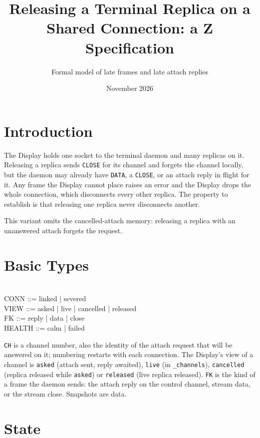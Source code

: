 \documentclass[a4paper,10pt,fleqn]{article}
\begin{document}
\title{Releasing a Terminal Replica on a Shared Connection: a Z Specification}
\author{Formal model of late frames and late attach replies}
\date{November 2026}
\maketitle

\section{Introduction}

The Display holds one socket to the terminal daemon and many replicas on it.
Releasing a replica sends \texttt{CLOSE} for its channel and forgets the
channel locally, but the daemon may already have \texttt{DATA}, a
\texttt{CLOSE}, or an attach reply in flight for it.  Any frame the Display
cannot place raises an error and the Display drops the whole connection, which
disconnects every other replica.  The property to establish is that releasing
one replica never disconnects another.

This variant omits the cancelled-attach memory: releasing a replica with an unanswered attach forgets the request.

\section{Basic Types}

\begin{zed}
  [CH] \\
  CONN ::= linked | severed \\
  VIEW ::= asked | live | cancelled | released \\
  FK ::= reply | data | close \\
  HEALTH ::= calm | failed
\end{zed}

\texttt{CH} is a channel number, also the identity of the attach request that
will be answered on it; numbering restarts with each connection.  The
Display's view of a channel is \texttt{asked} (attach sent, reply awaited),
\texttt{live} (in \texttt{\_channels}), \texttt{cancelled} (replica released
while \texttt{asked}) or \texttt{released} (live replica released).
\texttt{FK} is the kind of a frame the daemon sends: the attach reply on the
control channel, stream data, or the stream close.  Snapshots are data.

\section{State}
\end{document}
